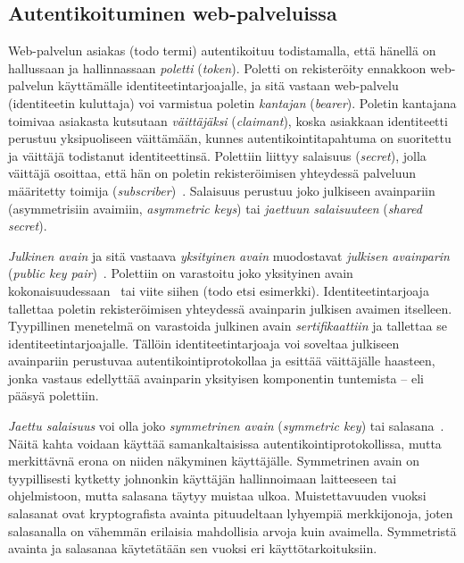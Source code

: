 \documentclass[finnish,gradu]{tktltiki}
\begin{document}

  \subsection{Autentikoituminen web-palveluissa} %
  \label{sub:autentikoituminen_salasanalla}

  Web-palvelun asiakas (todo termi) autentikoituu todistamalla, että hänellä on hallussaan ja hallinnassaan \emph{poletti} (\emph{token}). Poletti on rekisteröity ennakkoon web-palvelun käyttämälle identiteetintarjoajalle, ja sitä vastaan web-palvelu (identiteetin kuluttaja) voi varmistua poletin \emph{kantajan} (\emph{bearer}). Poletin kantajana toimivaa asiakasta kutsutaan \emph{väittäjäksi} (\emph{claimant}), koska asiakkaan identiteetti perustuu yksipuoliseen väittämään, kunnes autentikointitapahtuma on suoritettu ja väittäjä todistanut identiteettinsä. Polettiin liittyy salaisuus (\emph{secret}), jolla väittäjä osoittaa, että hän on poletin rekisteröimisen yhteydessä palveluun määritetty toimija (\emph{subscriber})~\cite{NIST_SP800-63-1}. Salaisuus perustuu joko julkiseen avainpariin (asymmetrisiin avaimiin, \emph{asymmetric keys}) tai \emph{jaettuun salaisuuteen} (\emph{shared secret}).

  \emph{Julkinen avain} ja sitä vastaava \emph{yksityinen avain} muodostavat \emph{julkisen avainparin} (\emph{public key pair})~\cite{NIST_SP800-63-1}.
  Polettiin on varastoitu joko yksityinen avain kokonaisuudessaan~\cite{NIST_SP800-63-1} tai viite siihen (todo etsi esimerkki).
  Identiteetintarjoaja tallettaa poletin rekisteröimisen yhteydessä avainparin julkisen avaimen itselleen. Tyypillinen menetelmä on varastoida julkinen avain \emph{sertifikaattiin} ja tallettaa se identiteetintarjoajalle. Tällöin identiteetintarjoaja voi soveltaa julkiseen avainpariin perustuvaa autentikointiprotokollaa ja esittää väittäjälle haasteen, jonka vastaus edellyttää avainparin yksityisen komponentin tuntemista -- eli pääsyä polettiin.

  \emph{Jaettu salaisuus} voi olla joko \emph{symmetrinen avain} (\emph{symmetric key}) tai salasana~\cite{NIST_SP800-63-1}. Näitä kahta voidaan käyttää samankaltaisissa autentikointiprotokollissa, mutta merkittävnä erona on niiden näkyminen käyttäjälle. Symmetrinen avain on tyypillisesti kytketty johnonkin käyttäjän hallinnoimaan laitteeseen tai ohjelmistoon, mutta salasana täytyy muistaa ulkoa. Muistettavuuden vuoksi salasanat ovat kryptografista avainta pituudeltaan lyhyempiä merkkijonoja, joten salasanalla on vähemmän erilaisia mahdollisia arvoja kuin avaimella. Symmetristä avainta ja salasanaa käytetätään sen vuoksi eri käyttötarkoituksiin.
\end{document}
